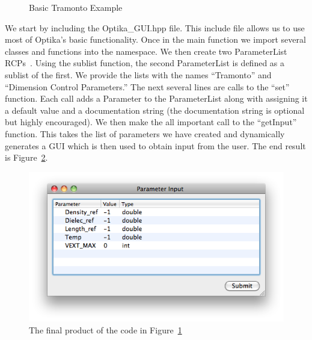 \begin{figure}
\centering
{\footnotesize

}
\caption{Basic Tramonto Example}
\label{basicTramonto}
\end{figure}
We start by including the Optika\_GUI.hpp file. This include file allows us to use most of Optika's basic functionality.
Once in the main function we import several classes and functions into the namespace. We then create two
ParameterList RCPs~\cite{RCP}. Using the sublist function, the second 
ParameterList is defined as a sublist of the first. We provide the lists with the names ``Tramonto'' and
``Dimension Control Parameters.'' The next several lines are calls to the ``set'' function. Each call
adds a Parameter to the ParameterList along with assigning it a default value and a documentation string (the 
documentation string is optional but highly encouraged). We then make
the all important call to the ``getInput'' function. This takes the list of parameters we have created and dynamically
generates a GUI which is then used to obtain input from the user. The end result is Figure~\ref{BasicTramontoScreenshot}.
\begin{figure}
\centering
\includegraphics[scale=0.5]{graphics/BasicTramontoScreenshot}
\caption{The final product of the code in Figure~\ref{basicTramonto}}
\label{BasicTramontoScreenshot}
\end{figure}

